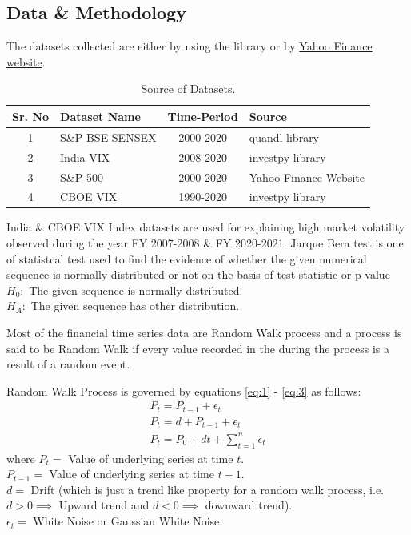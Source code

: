 \documentclass[conference]{IEEEtran}
\begin{document}
\subsection{Data \& Methodology}
The datasets collected are either by using the library or by \href{https://cutt.ly/5b6Yn9L}{Yahoo Finance website}.
\begin{table}[htbp]
    \renewcommand{\arraystretch}{1.5}
	\caption{Source of Datasets.}
	\begin{tabular}{| c | l | c | l |}
	\hline
		\textbf{Sr. No} & \textbf{Dataset Name} & \textbf{Time-Period} & \textbf{Source}       \\
	\hline
		1              & S\&P BSE SENSEX       & 2000-2020            & quandl library        \\
	\hline
		2              & India VIX             & 2008-2020            & investpy library      \\
	\hline
		3              & S\&P-500              & 2000-2020            & Yahoo Finance Website \\
	\hline
		4              & CBOE VIX              & 1990-2020            & investpy library \\     
	\hline
	\end{tabular}
\end{table}

India \& CBOE VIX Index datasets are used for explaining high market volatility observed during the year FY 2007-2008 \& FY 2020-2021. \newline
Jarque Bera test is one of statistcal test used to find the evidence of whether the given numerical sequence is normally distributed or not on the basis of test statistic or p-value \newline 
$H_{0}: $ The given sequence is normally distributed.\\
$H_{A}: $ The given sequence has other distribution.

Most of the financial time series data are Random Walk process and a process is said to be Random Walk if every value recorded in the during the process is a result of a random event.

Random Walk Process is governed by equations \eqref{eq:1} - \eqref{eq:3} as follows:  
\begin{align}
    P_{t} = P_{t - 1} + \epsilon_{t} \label{eq:1}\\
    P_{t} = d + P_{t - 1} + \epsilon_{t} \label{eq:2}\\
    P_{t} = P_{0} + dt + \sum_{t = 1}^{n} \epsilon_{t} \label{eq:3}
\end{align}
where   $P_{t} = $ Value of underlying series at time $t$. \\
$P_{t - 1} = $  Value of underlying series at time $t - 1$. \\
$d = $ Drift (which is just a trend like property for a random walk process, i.e.\\ $d > 0 \implies$ Upward trend and $d < 0 \implies$ downward trend).\\
$\epsilon_{t} = $ White Noise or Gaussian White Noise.
\end{document}
